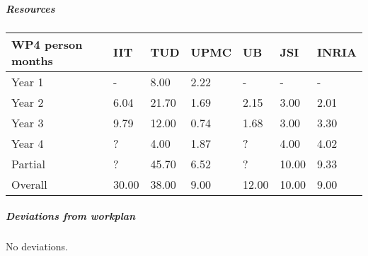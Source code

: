 
\subparagraph*{Resources}

\begin{center}
\begin{tabular}{|C{1.5cm}|C{1.5cm}|C{1.5cm}|C{2cm}|C{2cm}|C{2cm}|C{2cm}|}
\hline
\footnotesize \textbf{WP4 person months}& \footnotesize \textbf{IIT}&\footnotesize \textbf{TUD}&\footnotesize \textbf{UPMC}& \footnotesize \textbf{UB} &\footnotesize \textbf{JSI} &\footnotesize \textbf{INRIA}\\ \hline
\footnotesize Year 1  &  -        & 8.00   & 2.22 & -       & -        & -     \\  \hline
\footnotesize Year 2  &  6.04  & 21.70 & 1.69 & 2.15 & 3.00   & 2.01     \\  \hline
\footnotesize Year 3  &  9.79  & 12.00 & 0.74 & 1.68 & 3.00   & 3.30 \\  \hline
\footnotesize Year 4  & ?        & 4.00   & 1.87 & ?      & 4.00   & 4.02    \\   	\hline
\footnotesize Partial  & ?        & 45.70 & 6.52 & ?      & 10.00 & 9.33    \\
\hline \hline
\footnotesize Overall & 30.00 & 38.00 & 9.00 & 12.00&10.00 & 9.00 \\ \hline
\end{tabular}
\end{center}

\subparagraph*{Deviations from workplan} 

No deviations.


